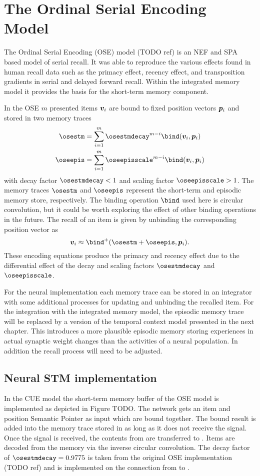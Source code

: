 \chapter{The Ordinal Serial Encoding Model}
The Ordinal Serial Encoding (OSE) model (TODO ref) is an NEF and SPA based model of serial recall.
It was able to reproduce the various effects found in human recall data such as the primacy effect, recency effect, and transposition gradients in serial and delayed forward recall.
Within the integrated memory model it provides the basis for the short-term memory component.

In the OSE $m$ presented items $\bm{v}_i$ are bound to fixed position vectors $\bm{p}_i$ and stored in two memory traces
\begin{align}
    \osestm &= \sum_{i=1}^m \osestmdecay^{m - i} \bind(\vc v_i, \vc p_i) \\
    \oseepis &= \sum_{i=1}^m \oseepisscale^{m - i} \bind(\vc v_i, \vc p_i)
\end{align}
with decay factor $\osestmdecay < 1$ and scaling factor $\oseepisscale > 1$.
The memory traces $\osestm$ and $\oseepis$ represent the short-term and episodic memory store, respectively.
The binding operation $\bind$ used here is circular convolution, but it could be worth exploring the effect of other binding operations in the future.
The recall of an item is given by unbinding the corresponding position vector as
\begin{equation}
    \vc v_i \approx \bind^+(\osestm + \oseepis, \vc p_i) \text{.}
\end{equation}
These encoding equations produce the primacy and recency effect due to the differential effect of the decay and scaling factors $\osestmdecay$ and $\oseepisscale$.

For the neural implementation each memory trace can be stored in an integrator with some additional processes for updating and unbinding the recalled item.
For the integration with the integrated memory model, the episodic memory trace will be replaced by a version of the temporal context model presented in the next chapter.
This introduces a more plausible episodic memory storing experiences in actual synaptic weight changes than the activities of a neural population.
In addition the recall process will need to be adjusted.


\section{Neural STM implementation}
In the CUE model the short-term memory buffer of the OSE model is implemented as depicted in Figure TODO\@.
The network gets an item and position Semantic Pointer as input which are bound together.
The bound result is added into the memory trace stored in  as long as it does not receive the  signal.
Once the  signal is received, the contents from  are transferred to .
Items are decoded from the memory via the  inverse circular convolution.
The decay factor of $\osestmdecay = 0.9775$ is taken from the original OSE implementation (TODO ref) and is implemented on the connection from  to .


